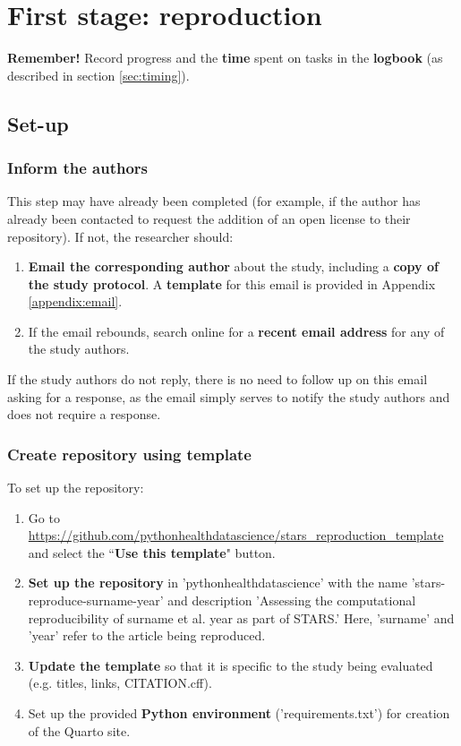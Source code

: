 \section{First stage: reproduction} \label{sec:reproduce}

\textbf{Remember!} Record progress and the \textbf{time} spent on tasks in the \textbf{logbook} (as described in section \ref{sec:timing}).

\vspace{0.5cm}
\subsection{Set-up}

\subsubsection{Inform the authors}

This step may have already been completed  (for example, if the author has already been contacted to request the addition of an open license to their repository). If not, the researcher should:
\begin{enumerate}
    \item \textbf{Email the corresponding author} about the study, including a \textbf{copy of the study protocol}. A \textbf{template} for this email is provided in Appendix \ref{appendix:email}.
    \item If the email rebounds, search online for a \textbf{recent email address} for any of the study authors.
\end{enumerate}

If the study authors do not reply, there is no need to follow up on this email asking for a response, as the email simply serves to notify the study authors and does not require a response.

\vspace{0.5cm}
\subsubsection{Create repository using template}

To set up the repository:

\begin{enumerate}
    \item Go to \url{https://github.com/pythonhealthdatascience/stars_reproduction_template}\autocite{heather_template_2024} and select the ``\textbf{Use this template}" button.
    \item \textbf{Set up the repository} in 'pythonhealthdatascience' with the name 'stars-reproduce-surname-year' and description 'Assessing the computational reproducibility of surname et al. year as part of STARS.' Here, 'surname' and 'year' refer to the article being reproduced.
    \item \textbf{Update the template} so that it is specific to the study being evaluated (e.g. titles, links, CITATION.cff).
    \item Set up the provided \textbf{Python environment} ('requirements.txt') for creation of the Quarto site.
\end{enumerate}

